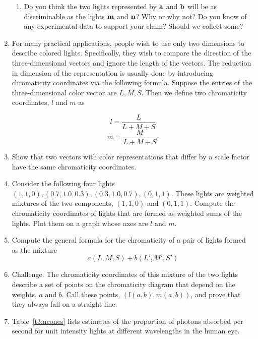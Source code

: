 \begin{enumerate}
\begin{enumerate}
 \item  Do you think the two lights represented by
$\bf a$ and $\bf b$ will be
as discriminable as the lights $\bf m$ and $\bf n$?
Why or why  not?
Do you know of any experimental data to support your
claim?
Should we collect some?

 \end{enumerate}

\item For many practical applications, people wish to
use only two dimensions to describe colored lights.
Specifically, they wish to compare the direction of the
three-dimensional vectors and ignore the length of the vectors.
The reduction in dimension
of the representation is usually
done by introducing chromaticity coordinates via the following
formula.
Suppose the entries of the three-dimensional
color vector are $L,M,S$.
Then we define two chromaticity coordinates, $l$ and $m$ as

\[
l = \frac{L}{L + M + S}
\]
\[
m = \frac{M}{L + M + S}.
\]

 \be

 \item Show that two vectors with color representations
that differ by a scale factor have the same chromaticity coordinates.

 \item 
Consider the following four lights
$(1,1,0),(0.7,1.0,0.3),(0.3,1.0,0.7),(0,1,1)$.
These lights are weighted mixtures of
the two components, $(1,1,0)$ and $(0,1,1)$.
Compute the chromaticity coordinates of 
lights that are formed as weighted sums of the lights.
Plot them on a graph whose axes are $l$ and $m$.

 \item Compute the general formula for the chromaticity of
a pair of lights formed as the mixture
\[
a (L,M,S) + b (L',M',S')
\]

 \item Challenge.  The chromaticity coordinates of this mixture
of the two lights describe a set of points on the chromaticity
diagram that depend on the weights, $a$ and $b$.
Call these points, $(l(a,b), m(a,b))$,
and prove that they always fall on a straight line.

 \ee



\item Table~\ref{t3:ncones} lists estimates of
the proportion of photons absorbed
per second for unit intensity lights
at different wavelengths in the human eye.


\end{enumerate}
